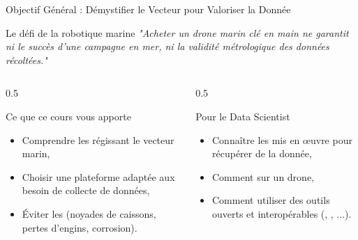 \begin{frame}{Objectif Général : Démystifier le Vecteur pour Valoriser la Donnée}
  \begin{alertblock}{Le défi de la robotique marine}
    \textit{"Acheter un drone marin clé en main ne garantit ni le succès d'une campagne en mer, ni la validité métrologique des données récoltées."}
  \end{alertblock}

  \vspace{0.5em}
  \begin{columns}[T]
    \begin{column}{0.5\textwidth}
      \begin{block}{Ce que ce cours vous apporte}
        \begin{itemize}
          \item Comprendre les  régissant le vecteur marin,
          \item Choisir une plateforme adaptée aux besoin de collecte de données,
          \item Éviter les  (noyades de caissons, pertes d'engins, corrosion).
        \end{itemize}
      \end{block}
    \end{column}
    \begin{column}{0.5\textwidth}
      \begin{block}{Pour le Data Scientist}
        \begin{itemize}
          \item Connaître les  mis en \oe uvre pour récupérer de la donnée,
          \item Comment  sur un drone,
          \item Comment utiliser des outils ouverts et interopérables (, , ...).
        \end{itemize}
      \end{block}
    \end{column}
  \end{columns}
\end{frame}

